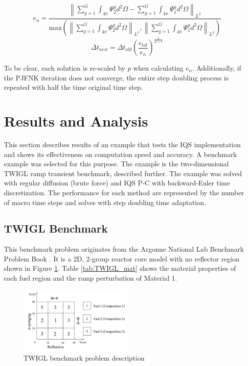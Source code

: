 \documentclass{anstrans}
\newcommand{\be}{\begin{equation}}
\newcommand{\ee}{\end{equation}}
\newcommand{\norm}[1]{\left\lVert#1\right\rVert_{L^2}}
\begin{document}
\be
e_n = \frac{\norm{\sum_{g=1}^G\int_{4\pi}\Psi^g_2 d^2\Omega - \sum_{g=1}^G\int_{4\pi}\Psi^g_1 d^2\Omega}}{\text{max}\left(\norm{\sum_{g=1}^G\int_{4\pi}\Psi^g_2 d^2\Omega},\norm{\sum_{g=1}^G \int_{4\pi}\Psi^g_1 d^2\Omega}\right)}
\label{eq:edt2}
\ee
\be
\Delta t_{new} = \Delta t_{old} \left(\frac{e_{tol}}{e_n}\right)^{\frac{1}{\mu+1}}
\label{eq:dt2}
\ee

To be clear, each solution is re-scaled by $p$ when calculating $e_n$.  Additionally, if the PJFNK iteration does not converge, the entire step doubling process is repeated with half the time original time step. 

\section{Results and Analysis}
This section describes results of an example that tests the IQS implementation and shows its effectiveness on computation speed and accuracy.  A benchmark example was selected for this purpose.  The example is the two-dimensional TWIGL ramp transient benchmark, described further.  The example was solved with regular diffusion (brute force) and IQS P-C with backward-Euler time discretization.  The performance for each method are represented by the number of macro time steps and solves with step doubling time adaptation.

\subsection{TWIGL Benchmark}

This benchmark problem originates from the Argonne National Lab Benchmark Problem Book \cite{BPB}.  It is a 2D, 2-group reactor core model with no reflector region shown in Figure \ref{fig:TWIGL_reg}.  Table \ref{tab:TWIGL_mat} shows the material properties of each fuel region and the ramp perturbation of Material 1.

\begin{figure}[!htbp]
\begin{center}
\includegraphics[width=0.5\textwidth]{TWIGL_regions.jpg}
\caption{TWIGL benchmark problem description}
\label{fig:TWIGL_reg}
\end{center}
\end{figure}
\end{document}
